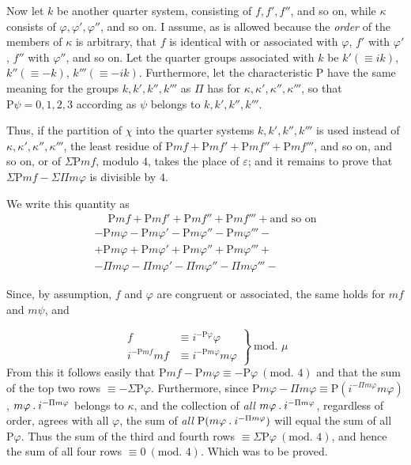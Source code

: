 Now let $k$ be another quarter system, consisting of $f,f',f''$, and so on, while $\kappa$ consists of $\varphi,\varphi',\varphi''$, and so on. I assume, as is allowed because the \emph{order} of the members of $\kappa$ is arbitrary, that $f$ is identical with or associated with $\varphi$, $f'$ with $\varphi'$, $f''$ with $\varphi''$, and so on. Let the quarter groups associated with $k$ be $k'(\equiv ik)$, $k''(\equiv-k)$, $k'''(\equiv-ik)$. Furthermore, let the characteristic $\mathrm{P}$ have the same meaning for the groups $k,k',k'',k'''$ as $\Pi$ has for $\kappa,\kappa',\kappa'',\kappa'''$, so that $\mathrm{P}\psi=0,1,2,3$ according as $\psi$ belongs to $k,k',k'',k'''$.

Thus, if the partition of $\chi$ into the quarter systems $k,k',k'',k'''$ is used instead of $\kappa,\kappa',\kappa'',\kappa'''$, the least residue of $\mathrm{P}mf+\mathrm{P}mf'+\mathrm{P}mf''+\mathrm{P}mf'''$, and so on, and so on, or of $\Sigma\mathrm{P}mf$, modulo $4$, takes the place of $\varepsilon$; and it remains to prove that $\Sigma\mathrm{P}mf-\Sigma\Pi m\varphi$ is divisible by $4$.

We write this quantity as
\[
\begin{array}{l}
\phantom{+}\mathrm{P}mf+\mathrm{P}mf'+\mathrm{P}mf''+\mathrm{P}mf'''+\text{and so on}\\
-\mathrm{P}m\varphi-\mathrm{P}m\varphi'-\mathrm{P}m\varphi''-\mathrm{P}m\varphi'''-\\
+\mathrm{P}m\varphi+\mathrm{P}m\varphi'+\mathrm{P}m\varphi''+\mathrm{P}m\varphi'''+\\
-\Pi m\varphi-\Pi m\varphi'-\Pi m\varphi''-\Pi m\varphi'''-
\end{array}
\]

Since, by assumption, $f$ and $\varphi$ are congruent or associated, the same holds for $mf$ and $m\psi$, and

\[
\left.\begin{aligned}
f&\equiv i^{-\mathrm{P}\varphi}\varphi\\
i^{-\mathrm{P}mf}mf&\equiv i^{-\mathrm{P}m\varphi}m\varphi
\end{aligned}\right\}\ \text{mod. }\mu
\]
From this it follows easily that $\mathrm{P}mf-\mathrm{P}m\varphi\equiv-\mathrm{P}\varphi\ (\text{mod. }4)$ and that the sum of the top two rows $\equiv-\Sigma\mathrm{P}\varphi$. Furthermore, since $\mathrm{P}m\varphi-\Pi m\varphi\equiv\mathrm{P}(i^{-\Pi m\varphi}m\varphi)$, $m\varphi\mathbin{.} i^{-\Pi m\varphi}$ belongs to $\kappa$, and the collection of \emph{all} $m\varphi\mathbin{.} i^{-\Pi m\varphi}$, regardless of order, agrees with all $\varphi$, the sum of \emph{all} $\mathrm{P}(m\varphi\mathbin{.} i^{-\Pi m\varphi})$ will equal the sum of all $\mathrm{P}\varphi$. Thus the sum of the third and fourth rows $\equiv\Sigma\mathrm{P}\varphi\ (\text{mod. }4)$, and hence the sum of all four rows $\equiv0\ (\text{mod. }4)$. Which was to be proved.

